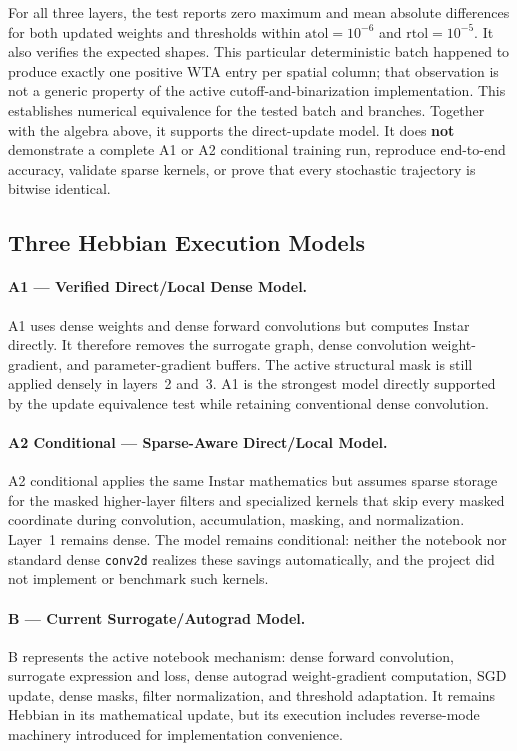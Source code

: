 \documentclass{article}
\begin{document}
    For all three layers, the test reports zero maximum and mean absolute differences for both updated weights and thresholds within $\text{atol} = 10^{-6}$ and $\text{rtol} = 10^{-5}$. It also verifies the expected shapes. This particular deterministic batch happened to produce exactly one positive WTA entry per spatial column; that observation is not a generic property of the active cutoff-and-binarization implementation. This establishes numerical equivalence for the tested batch and branches. Together with the algebra above, it supports the direct-update model. It does \textbf{not} demonstrate a complete A1 or A2 conditional training run, reproduce end-to-end accuracy, validate sparse kernels, or prove that every stochastic trajectory is bitwise identical.
    
    \subsection{Three Hebbian Execution Models}
    
    \paragraph{A1 --- Verified Direct/Local Dense Model.} A1 uses dense weights and dense forward convolutions but computes Instar directly. It therefore removes the surrogate graph, dense convolution weight-gradient, and parameter-gradient buffers. The active structural mask is still applied densely in layers~2 and~3. A1 is the strongest model directly supported by the update equivalence test while retaining conventional dense convolution.
    
    \paragraph{A2 Conditional --- Sparse-Aware Direct/Local Model.} A2 conditional applies the same Instar mathematics but assumes sparse storage for the masked higher-layer filters and specialized kernels that skip every masked coordinate during convolution, accumulation, masking, and normalization. Layer~1 remains dense. The model remains conditional: neither the notebook nor standard dense \texttt{conv2d} realizes these savings automatically, and the project did not implement or benchmark such kernels.
    
    \paragraph{B --- Current Surrogate/Autograd Model.} B represents the active notebook mechanism: dense forward convolution, surrogate expression and loss, dense autograd weight-gradient computation, SGD update, dense masks, filter normalization, and threshold adaptation. It remains Hebbian in its mathematical update, but its execution includes reverse-mode machinery introduced for implementation convenience.
    
\end{document}
